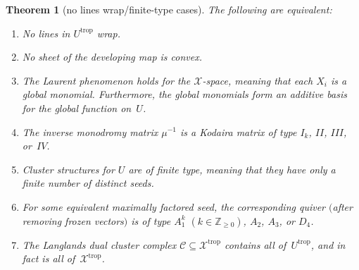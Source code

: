 \documentclass[pdftex]{sigma}
\numberwithin{equation}{section}
\numberwithin{figure}{section}
\numberwithin{table}{section}
\DeclareMathOperator{\trop}{trop}
\let\bb=\mathbb
\let\s=\mathcal
\newtheorem{thm}{Theorem}[section]
\theoremstyle{definition}
\begin{document}
\begin{thm}[no lines wrap/finite-type cases]\label{no-wrap}
The following are equivalent:
\begin{enumerate}\itemsep=0pt
\item[$1.$] No {lines} in $U^{\trop}$ wrap.
\item[$2.$] No sheet of the {developing map} is convex.
\item[$3.$] The Laurent phenomenon holds for the $\s{X}$-space, meaning that each $X_i$ is a global monomial. Furthermore, the {global monomials} form an additive basis for the global function on~$U$.
\item[$4.$] The inverse {monodromy} matrix $\mu^{-1}$ is a Kodaira matrix of type $I_k$, $II$, $III$, or~$IV$.
\item[$5.$] Cluster structures for $U$ are of {finite type}, meaning that they have only a finite number of distinct seeds.
\item[$6.$] For some equivalent maximally factored seed, the corresponding quiver $($after removing frozen vectors$)$ is of type $A_1^k$ $(k\in \bb{Z}_{\geq 0})$, $A_2$, $A_3$, or $D_4$.
\item[$7.$] The Langlands dual {cluster complex} $\s{C}\subseteq \s{X}^{\trop}$ contains all of~$U^{\trop}$, and in fact is all of~$\s{X}^{\trop}$.
\end{enumerate}
\end{thm}
\end{document}
